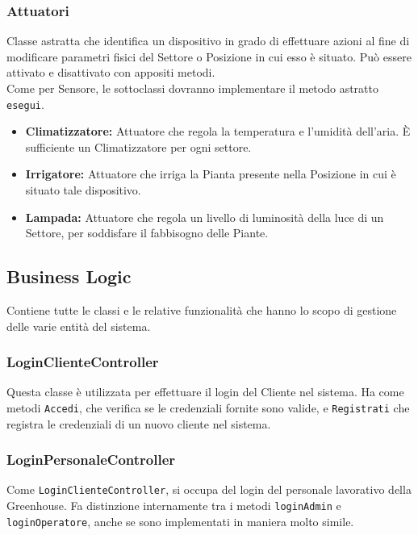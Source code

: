 \documentclass{article}
\newcommand{\code}[1]{\texttt{#1}}
\begin{document}
\subsubsection{Attuatori}
    Classe astratta che identifica un dispositivo in grado di effettuare azioni al fine di modificare parametri fisici del Settore o Posizione in cui esso è situato.
    Può essere attivato e disattivato con appositi metodi.\\
    Come per Sensore, le sottoclassi dovranno implementare il metodo astratto \code{esegui}.
    \begin{itemize}
        \item \textbf{Climatizzatore:}
        Attuatore che regola la temperatura e l'umidità dell'aria. È sufficiente un Climatizzatore per ogni settore.
        \item \textbf{Irrigatore:}
        Attuatore che irriga la Pianta presente nella Posizione in cui è situato tale dispositivo.
        \item \textbf{Lampada:}
        Attuatore che regola un livello di luminosità della luce di un Settore, per soddisfare il fabbisogno delle Piante.
    \end{itemize}

\newpage

\subsection{Business Logic}
Contiene tutte le classi e le relative funzionalità che hanno lo scopo di gestione delle varie entità del sistema.

\subsubsection{LoginClienteController}
Questa classe è utilizzata per effettuare il login del Cliente nel sistema. Ha come metodi \code{Accedi}, che verifica se le credenziali fornite sono valide, e \code{Registrati} che registra le credenziali di un nuovo cliente nel sistema.

\subsubsection{LoginPersonaleController}
Come \code{LoginClienteController}, si occupa del login del personale lavorativo della Greenhouse. Fa distinzione internamente tra i metodi \code{loginAdmin} e \code{loginOperatore}, anche se sono implementati in maniera molto simile.
\end{document}
